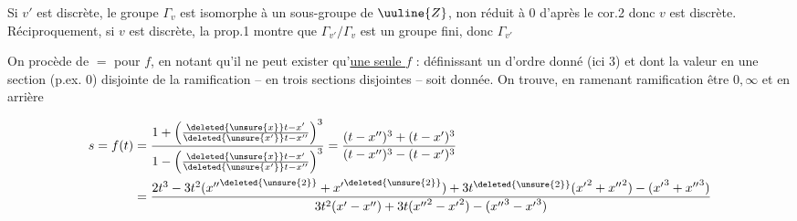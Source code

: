 Si $v'$ est discrète, le groupe $\Gamma_v$ est isomorphe à un sous-groupe de $\uuline{Z}$, non réduit à $0$ d'après le cor.2 donc $v$ est discrète. Réciproquement, si $v$ est discrète, la prop.1 montre que $\Gamma_{v'}/\Gamma_v$ est un groupe fini, donc $\Gamma_{v'}$

On procède de $=$ pour $f$, en notant  qu'il ne peut exister qu'\uline{une seule $f$} :   définissant un  d'ordre donné (ici 3) et dont la valeur en une section (p.ex. 0) disjointe de la ramification --  en trois sections disjointes -- soit donnée. On trouve, en ramenant  ramification  être $0,\infty$ et  en arrière

\begingroup\small
\[
\begin{aligned}
s=f(t)&=\frac{1+\left(\frac{\deleted{\unsure{x}}t-x'}{\deleted{\unsure{x'}}t-x''}\right)^3}
{1-\left(\frac{\deleted{\unsure{x}}t-x'}{\deleted{\unsure{x'}}t-x''}\right)^3}
=\frac{(t-x'')^3+(t-x')^3}{(t-x'')^3-(t-x')^3}\\
&=\frac{2t^3-3t^2({x''}^{\deleted{\unsure{2}}}+{x'}^{\deleted{\unsure{2}}})+3t^{\deleted{\unsure{2}}}({x'}^{2}+{x''}^{2})-({x'}^{3}+{x''}^{3})}
{3t^2(x'-x'')+3t({x''}^{2}-{x'}^{2})-({x''}^{3}-{x'}^{3})}
\end{aligned}
\]
\endgroup

